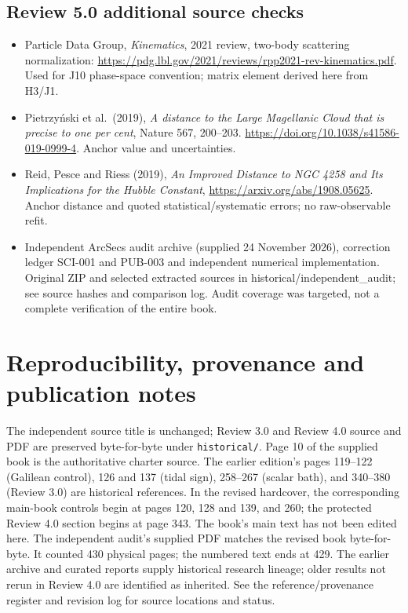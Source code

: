 \documentclass[
  11pt,
  twoside]{article}
\providecommand{\tightlist}{%
  \setlength{\itemsep}{0pt}\setlength{\parskip}{0pt}}
\begin{document}
\subsection{Review 5.0 additional source
checks}\label{review-5.0-additional-source-checks}

\begin{itemize}
\tightlist
\item
  Particle Data Group, \emph{Kinematics}, 2021 review, two-body
  scattering normalization:
  \url{https://pdg.lbl.gov/2021/reviews/rpp2021-rev-kinematics.pdf}.
  Used for J10 phase-space convention; matrix element derived here from
  H3/J1.
\item
  Pietrzyński et al.~(2019), \emph{A distance to the Large Magellanic
  Cloud that is precise to one per cent}, Nature 567, 200--203.
  \url{https://doi.org/10.1038/s41586-019-0999-4}. Anchor value and
  uncertainties.
\item
  Reid, Pesce and Riess (2019), \emph{An Improved Distance to NGC 4258
  and Its Implications for the Hubble Constant},
  \url{https://arxiv.org/abs/1908.05625}. Anchor distance and quoted
  statistical/systematic errors; no raw-observable refit.
\item
  Independent ArcSecs audit archive (supplied 24 November 2026),
  correction ledger SCI-001 and PUB-003 and independent numerical
  implementation. Original ZIP and selected extracted sources in
  historical/independent\_audit; see source hashes and comparison log.
  Audit coverage was targeted, not a complete verification of the entire
  book.
\end{itemize}

\section{Reproducibility, provenance and publication
notes}\label{reproducibility-provenance-and-publication-notes}

The independent source title is unchanged; Review 3.0 and Review 4.0
source and PDF are preserved byte-for-byte under
\nolinkurl{historical/}. Page 10 of the supplied book is the
authoritative charter source. The earlier edition's pages 119--122
(Galilean control), 126 and 137 (tidal sign), 258--267 (scalar bath),
and 340--380 (Review 3.0) are historical references. In the revised
hardcover, the corresponding main-book controls begin at pages 120, 128
and 139, and 260; the protected Review 4.0 section begins at page 343.
The book's main text has not been edited here. The independent audit's
supplied PDF matches the revised book byte-for-byte. It counted 430
physical pages; the numbered text ends at 429. The earlier archive and
curated reports supply historical research lineage; older results not
rerun in Review 4.0 are identified as inherited. See the
reference/provenance register and revision log for source locations and
status.
\end{document}
